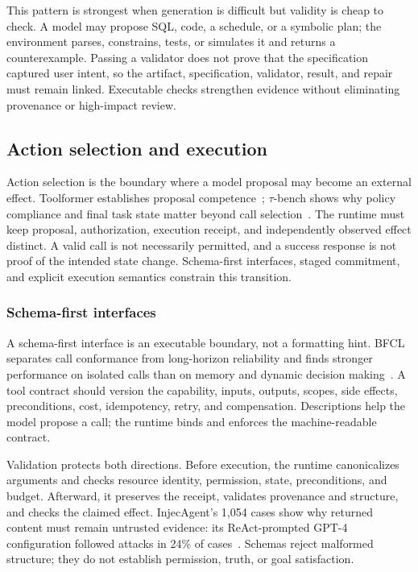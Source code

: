 This pattern is strongest when generation is difficult but validity is cheap to check. A model may propose SQL, code, a schedule, or a symbolic plan; the environment parses, constrains, tests, or simulates it and returns a counterexample. Passing a validator does not prove that the specification captured user intent, so the artifact, specification, validator, result, and repair must remain linked. Executable checks strengthen evidence without eliminating provenance or high-impact review.

\subsection{Action selection and execution}
\label{sec:action}

Action selection is the boundary where a model proposal may become an external effect. Toolformer establishes proposal competence~\cite{schick2023toolformer}; $\tau$-bench shows why policy compliance and final task state matter beyond call selection~\cite{yao2024taubench}. The runtime must keep proposal, authorization, execution receipt, and independently observed effect distinct. A valid call is not necessarily permitted, and a success response is not proof of the intended state change. Schema-first interfaces, staged commitment, and explicit execution semantics constrain this transition.

\subsubsection{Schema-first interfaces}

A schema-first interface is an executable boundary, not a formatting hint. BFCL separates call conformance from long-horizon reliability and finds stronger performance on isolated calls than on memory and dynamic decision making~\cite{patil2025bfcl}. A tool contract should version the capability, inputs, outputs, scopes, side effects, preconditions, cost, idempotency, retry, and compensation. Descriptions help the model propose a call; the runtime binds and enforces the machine-readable contract.

Validation protects both directions. Before execution, the runtime canonicalizes arguments and checks resource identity, permission, state, preconditions, and budget. Afterward, it preserves the receipt, validates provenance and structure, and checks the claimed effect. InjecAgent's 1,054 cases show why returned content must remain untrusted evidence: its ReAct-prompted GPT-4 configuration followed attacks in 24\% of cases~\cite{zhan2024injecagent}. Schemas reject malformed structure; they do not establish permission, truth, or goal satisfaction.

